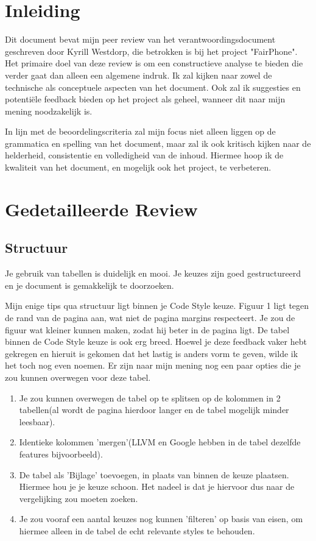 \documentclass[a4paper]{article}
\begin{document}
\tableofcontents
\clearpage

\section{Inleiding}
Dit document bevat mijn peer review van het verantwoordingsdocument geschreven door Kyrill Westdorp, die betrokken is bij het project "FairPhone". 
Het primaire doel van deze review is om een constructieve analyse te bieden die verder gaat dan alleen een algemene indruk. 
Ik zal kijken naar zowel de technische als conceptuele aspecten van het document. Ook zal ik suggesties en potentiële feedback bieden op het project als geheel, wanneer dit naar mijn mening noodzakelijk is.
\par \smallskip
In lijn met de beoordelingscriteria zal mijn focus niet alleen liggen op de grammatica en spelling van het document, maar zal ik ook kritisch kijken naar de helderheid, consistentie en volledigheid van de inhoud.
Hiermee hoop ik de kwaliteit van het document, en mogelijk ook het project, te verbeteren.



\section{Gedetailleerde Review}
\subsection{Structuur}
Je gebruik van tabellen is duidelijk en mooi. Je keuzes zijn goed gestructureerd en je document is gemakkelijk te doorzoeken.
\par\smallskip 
Mijn enige tips qua structuur ligt binnen je Code Style keuze.
Figuur 1 ligt tegen de rand van de pagina aan, wat niet de pagina margins respecteert. Je zou de figuur wat kleiner kunnen maken, zodat hij beter in de pagina ligt.
De tabel binnen de Code Style keuze is ook erg breed. Hoewel je deze feedback vaker hebt gekregen en hieruit is gekomen dat het lastig is anders vorm te geven, wilde ik het toch nog even noemen.
Er zijn naar mijn mening nog een paar opties die je zou kunnen overwegen voor deze tabel.
\begin{enumerate}
  \item Je zou kunnen overwegen de tabel op te splitsen op de kolommen in 2 tabellen(al wordt de pagina hierdoor langer en de tabel mogelijk minder leesbaar).
  \item Identieke kolommen 'mergen'(LLVM en Google hebben in de tabel dezelfde features bijvoorbeeld).
  \item De tabel als 'Bijlage' toevoegen, in plaats van binnen de keuze plaatsen. Hiermee hou je je keuze schoon. Het nadeel is dat je hiervoor dus naar de vergelijking zou moeten zoeken.
  \item Je zou vooraf een aantal keuzes nog kunnen 'filteren' op basis van eisen, om hiermee alleen in de tabel de echt relevante styles te behouden.
\end{enumerate}
\end{document}
